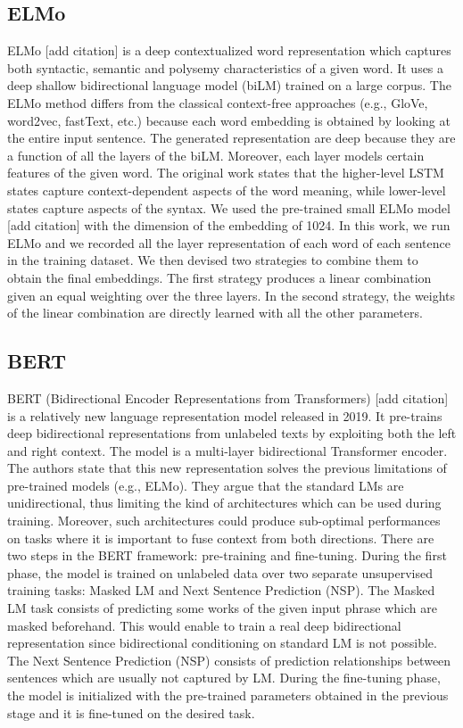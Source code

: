 \documentclass[11pt,a4paper]{article}
\begin{document}
\subsection{ELMo}
ELMo [add citation] is a deep contextualized word representation which captures both syntactic, semantic and polysemy characteristics of a given word. It uses a deep shallow bidirectional language model (biLM) trained on a large corpus. The ELMo method differs from the classical context-free approaches (e.g., GloVe, word2vec, fastText, etc.) because each word embedding is obtained by looking at the entire input sentence.  The generated representation are deep because they are a function of all the layers of the biLM. Moreover, each layer models certain features of the given word. The original work states that the higher-level LSTM states capture context-dependent aspects of the word meaning, while lower-level states capture aspects of the syntax.
We used the pre-trained small ELMo model [add citation] with the dimension of the embedding of 1024.
In this work, we run ELMo and we recorded all the layer representation of each word of each sentence in the training dataset. We then devised two strategies to combine them to obtain the final embeddings. The first strategy produces a linear combination given an equal weighting over the three layers. In the second strategy, the weights of the linear combination are directly learned with all the other parameters. 


\subsection{BERT}

BERT (Bidirectional Encoder Representations from Transformers) [add citation] is a relatively new language representation model released in 2019. It pre-trains deep bidirectional representations from unlabeled texts by exploiting both the left and right context. The model is a multi-layer bidirectional Transformer encoder. The authors state that this new representation solves the previous limitations of pre-trained models (e.g., ELMo). They argue that the standard LMs are unidirectional, thus limiting the kind of architectures which can be used during training. Moreover, such architectures could produce sub-optimal performances on tasks where it is important to fuse context from both directions. 
There are two steps in the BERT framework: pre-training and fine-tuning. During the first phase, the model is trained on unlabeled data over two separate unsupervised training tasks: Masked LM and Next Sentence Prediction (NSP).  The Masked LM task consists of predicting some works of the given input phrase which are masked beforehand.  This would enable to train a real deep bidirectional representation since bidirectional conditioning on standard LM is not possible. The Next Sentence Prediction (NSP) consists of prediction relationships between sentences which are usually not captured by LM. 
During the fine-tuning phase, the model is initialized with the pre-trained parameters obtained in the previous stage and it is fine-tuned on the desired task. 
\end{document}
